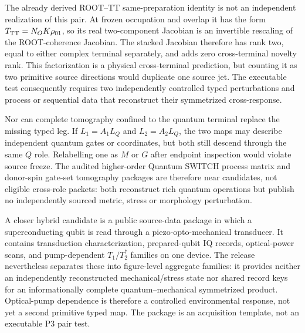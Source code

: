 The already derived ROOT--TT same-preparation identity is not an independent
realization of this pair.  At frozen occupation and overlap it has the form
$T_{\rm TT}=N_OK\rho_{01}$, so its real two-component Jacobian is an
invertible rescaling of the ROOT-coherence Jacobian.  The stacked Jacobian
therefore has rank two, equal to either complex terminal separately, and adds
zero cross-terminal novelty rank.  This factorization is a physical
cross-terminal prediction, but counting it as two primitive source directions
would duplicate one source jet.  The executable test consequently requires
two independently controlled typed perturbations and process or sequential
data that reconstruct their symmetrized cross-response.

Nor can complete tomography confined to the quantum terminal replace the
missing typed leg.  If $L_1=A_1L_Q$ and $L_2=A_2L_Q$, the two maps may describe
independent quantum gates or coordinates, but both still descend through the
same $Q$ role.  Relabelling one as $M$ or $G$ after endpoint inspection would
violate source freeze.  The audited higher-order Quantum SWITCH process matrix
and donor-spin gate-set tomography packages are therefore near candidates,
not eligible cross-role packets: both reconstruct rich quantum operations but
publish no independently sourced metric, stress or morphology perturbation.

A closer hybrid candidate is a public source-data package in which a
superconducting qubit is read through a piezo-opto-mechanical transducer.  It contains transduction
characterization, prepared-qubit IQ records, optical-power scans, and
pump-dependent $T_1/T_2^*$ families on one device.  The release nevertheless
separates these into figure-level aggregate families: it provides neither an
independently reconstructed mechanical/stress state nor shared record keys
for an informationally complete quantum--mechanical symmetrized product.
Optical-pump dependence is therefore a controlled environmental response, not
yet a second primitive typed map.  The package is an acquisition template,
not an executable P3 pair test.

